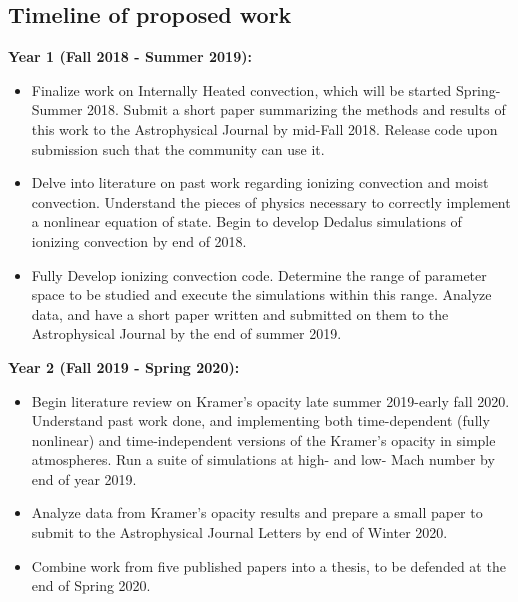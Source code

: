 \documentclass[aasms,12pt]{article}
\begin{document}
\subsection{Timeline of proposed work}
\textbf{Year 1 (Fall 2018 - Summer 2019):}
\begin{itemize}
\vspace{-0.2cm}
\item Finalize work on Internally Heated convection, which will be started Spring-Summer 2018.
Submit a short paper summarizing the methods and results of this work to the Astrophysical Journal
by mid-Fall 2018.  Release code upon submission such that the community can use it.
\vspace{-0.2cm}
\item Delve into literature on past work regarding ionizing convection and moist convection.
Understand the pieces of physics necessary to correctly implement a nonlinear equation of state.
Begin to develop Dedalus simulations of ionizing convection by end of 2018.
\vspace{-0.2cm}
\item Fully Develop ionizing convection code.  Determine the range of parameter space to be studied
and execute the simulations within this range.  Analyze data, and have a short paper written and
submitted on them to the Astrophysical Journal by the end of summer 2019.
\end{itemize}

\textbf{Year 2 (Fall 2019 - Spring 2020):}
\begin{itemize}
\vspace{-0.2cm}
\item Begin literature review on Kramer's opacity late summer 2019-early fall 2020.  Understand
past work done, and implementing both time-dependent (fully nonlinear) and time-independent
versions of the Kramer's opacity in simple atmospheres.  Run a suite of simulations at high-
and low- Mach number by end of year 2019.
\vspace{-0.2cm}
\item Analyze data from Kramer's opacity results and prepare a small paper to submit to the
Astrophysical Journal Letters by end of Winter 2020.
\vspace{-0.2cm}
\item Combine work from five published papers into a thesis, to be defended at the end of 
Spring 2020.
\end{itemize}
\end{document}
